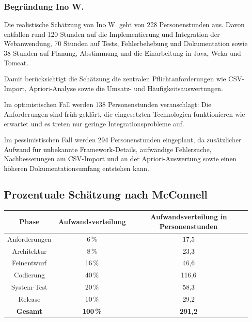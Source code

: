 \documentclass[a4paper,10pt]{article}
\begin{document}
        \par\noindent\begin{minipage}{\linewidth}
\vspace{10pt}
\subsubsection*{Begründung Ino W.}
        Die realistische Schätzung von Ino W. geht von 228 Personenstunden aus.
        Davon entfallen rund 120 Stunden auf die Implementierung und Integration der Webanwendung,
        70 Stunden auf Tests, Fehlerbehebung und Dokumentation sowie 38 Stunden auf Planung,
        Abstimmung und die Einarbeitung in Java, Weka und Tomcat.\par
        Damit berücksichtigt die Schätzung die zentralen Pflichtanforderungen wie CSV-Import,
        Apriori-Analyse sowie die Umsatz- und
        Häufigkeitsauswertungen.
\par
        Im optimistischen Fall werden 138 Personenstunden veranschlagt: Die Anforderungen sind früh
        geklärt, die eingesetzten Technologien funktionieren wie erwartet und es treten nur geringe
        Integrationsprobleme auf. \par
        Im pessimistischen Fall werden 294 Personenstunden eingeplant, da
        zusätzlicher Aufwand für unbekannte Framework-Details, aufwändige Fehlersuche, Nachbesserungen
        am CSV-Import und an der Apriori-Auswertung sowie einen höheren Dokumentationsumfang entstehen
        kann. \par


        
\end{minipage}\par
\subsection*{Prozentuale Schätzung nach McConnell}
        \par\noindent\begin{minipage}{\linewidth}
\centering
{}
\begin{tabular}{c|c|c}
            \hline
            Phase & Aufwandsverteilung & Aufwandsverteilung in Personenstunden \\
            \hline
            Anforderungen & 6\,\% & 17,5 \\
            Architektur & 8\,\% & 23,3 \\
            Feinentwurf & 16\,\% & 46,6 \\
            Codierung & 40\,\% & 116,6 \\
            System-Test & 20\,\% & 58,3 \\
            Release & 10\,\% & 29,2 \\
            \hline
            \textbf{Gesamt} & \textbf{100\,\%} & \textbf{291,2}
        \end{tabular}
\end{minipage}\par
\end{document}
